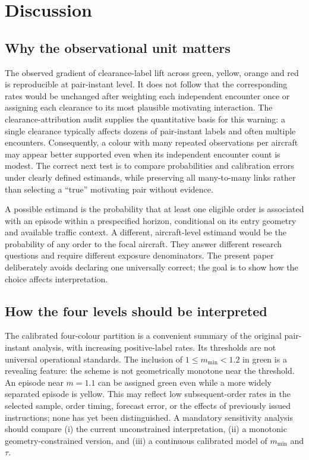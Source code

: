 \documentclass[pdflatex,sn-mathphys-num]{sn-jnl}
\newcommand{\mmin}{m_{\min}}
\begin{document}
\section{Discussion}\label{sec:discussion}
\subsection{Why the observational unit matters}
The observed gradient of clearance-label lift across green, yellow, orange and red is reproducible at pair-instant level. It does not follow that the corresponding rates would be unchanged after weighting each independent encounter once or assigning each clearance to its most plausible motivating interaction. The clearance-attribution audit supplies the quantitative basis for this warning: a single clearance typically affects dozens of pair-instant labels and often multiple encounters. Consequently, a colour with many repeated observations per aircraft may appear better supported even when its independent encounter count is modest. The correct next test is to compare probabilities and calibration errors under clearly defined estimands, while preserving all many-to-many links rather than selecting a ``true'' motivating pair without evidence.

A possible estimand is the probability that at least one eligible order is associated with an episode within a prespecified horizon, conditional on its entry geometry and available traffic context. A different, aircraft-level estimand would be the probability of any order to the focal aircraft. They answer different research questions and require different exposure denominators. The present paper deliberately avoids declaring one universally correct; the goal is to show how the choice affects interpretation.

\subsection{How the four levels should be interpreted}
The calibrated four-colour partition is a convenient summary of the original pair-instant analysis, with increasing positive-label rates. Its thresholds are not universal operational standards. The inclusion of $1\le\mmin<1.2$ in green is a revealing feature: the scheme is not geometrically monotone near the threshold. An episode near $m=1.1$ can be assigned green even while a more widely separated episode is yellow. This may reflect low subsequent-order rates in the selected sample, order timing, forecast error, or the effects of previously issued instructions; none has yet been distinguished. A mandatory sensitivity analysis should compare (i) the current unconstrained interpretation, (ii) a monotonic geometry-constrained version, and (iii) a continuous calibrated model of $\mmin$ and $\tau$.
\end{document}
